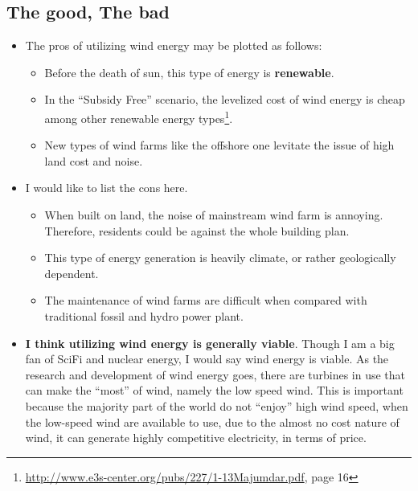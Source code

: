 \documentclass[12pt]{article}
\begin{document}
\subsection{The good, The bad}
\label{sec:good-bad}

\begin{itemize}
\item The pros of utilizing wind energy may be plotted as follows:
  \begin{itemize}
  \item Before the death of sun, this type of energy is
    \textbf{renewable}.
  \item In the ``Subsidy Free'' scenario, the levelized cost of wind
    energy is cheap among other renewable energy
    types\footnote{\url{http://www.e3s-center.org/pubs/227/1-13Majumdar.pdf},
      page 16}. 
  \item New types of wind farms like the offshore one levitate the
    issue of high land cost and noise.
  \end{itemize}
\item I would like to list the cons here.
  \begin{itemize}
  \item When built on land, the noise of mainstream wind farm is
    annoying. Therefore, residents could be against the whole building
    plan. 
  \item This type of energy generation is heavily climate, or rather
    geologically dependent. 
  \item The maintenance of wind farms are difficult when compared with
    traditional fossil and hydro power plant.
  \end{itemize}
\item \textbf{I think utilizing wind energy is generally
    viable}.  Though I am a big fan of SciFi and nuclear energy, I
  would say wind energy is viable. As the research and development of
  wind energy goes, there are turbines in use that can make the
  ``most'' of wind, namely the low speed wind. This is important
  because the majority part of the world do not ``enjoy'' high wind
  speed, when the low-speed wind are available to use, due to the
  almost no cost nature of wind, it can generate highly competitive
  electricity, in terms of price.
\end{itemize}
\end{document}
